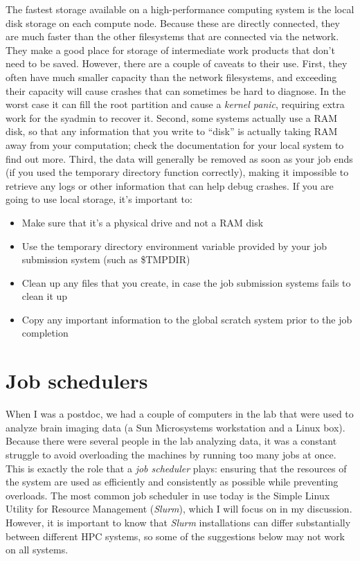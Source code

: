 The fastest storage available on a high-performance computing system is the local disk storage on each compute node. Because these are directly connected, they are much faster than the other filesystems that are connected via the network.  They make a good place for storage of intermediate work products that don't need to be saved. However, there are a couple of caveats to their use. First, they often have much smaller capacity than the network filesystems, and exceeding their capacity will cause crashes that can sometimes be hard to diagnose.  In the worst case it can fill the root partition and cause a \textit{kernel panic}, requiring extra work for the syadmin to recover it.  Second, some systems actually use a RAM disk, so that any information that you write to ``disk'' is actually taking RAM away from your computation; check the documentation for your local system to find out more.  Third, the data will generally be removed as soon as your job ends (if you used the temporary directory function correctly), making it impossible to retrieve any logs or other information that can help debug crashes.  If you are going to use local storage, it's important to:

\begin{itemize}
\item Make sure that it's a physical drive and not a RAM disk
\item Use the temporary directory environment variable provided by your job submission system (such as \$TMPDIR)
\item Clean up any files that you create, in case the job submission systems fails to clean it up
\item Copy any important information to the global scratch system prior to the job completion
\end{itemize}

\section{Job schedulers}

When I was a postdoc, we had a couple of computers in the lab that were used to analyze brain imaging data (a Sun Microsystems workstation and a Linux box). Because there were several people in the lab analyzing data, it was a constant struggle to avoid overloading the machines by running too many jobs at once.  This is exactly the role that a \textit{job scheduler} plays: ensuring that the resources of the system are used as efficiently and consistently as possible while preventing overloads.  The most common job scheduler in use today is the Simple Linux Utility for Resource Management (\textit{Slurm}), which I will focus on in my discussion.  However, it is important to know that \textit{Slurm} installations can differ substantially between different HPC systems, so some of the suggestions below may not work on all systems.

